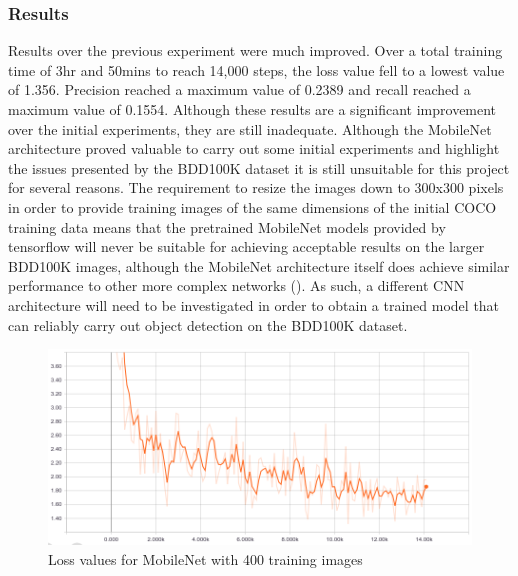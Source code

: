 \documentclass[12pt]{report}
\begin{document}
\subsubsection*{Results}
\begin{flushleft}
Results over the previous experiment were much improved. Over a total training time of 3hr and 50mins to reach 14,000 steps, the loss value fell to a lowest value of 1.356. Precision reached a maximum value of 0.2389 and recall reached a maximum value of 0.1554. Although these results are a significant improvement over the initial experiments, they are still inadequate. Although the MobileNet architecture proved valuable to carry out some initial experiments and highlight the issues presented by the BDD100K dataset it is still unsuitable for this project for several reasons. The requirement to resize the images down to 300x300 pixels in order to provide training images of the same dimensions of the initial COCO training data means that the pretrained MobileNet models provided by tensorflow will never be suitable for achieving acceptable results on the larger BDD100K images, although the MobileNet architecture itself does achieve similar performance to other more complex networks (\cite{howard2017mobilenets}). As such, a different CNN architecture will need to be investigated in order to obtain a trained model that can reliably carry out object detection on the BDD100K dataset.
\end{flushleft}

\vspace{0.5cm}
\begin{figure}[ht!]
	\centering
	\includegraphics[width=15cm]{loss-mobilenet-2}
	\caption{Loss values for MobileNet with 400 training images}
	\label{fig:loss-mobilenet-2}
\end{figure}
\end{document}
